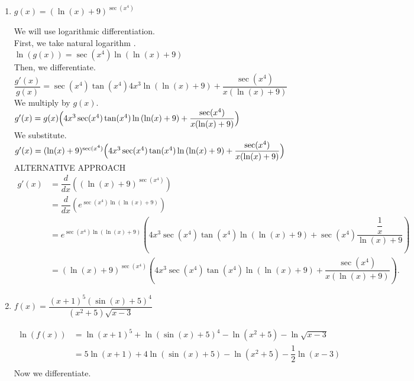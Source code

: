 \documentclass{ximera}
\begin{document}
\begin{problem}
\begin{enumerate}
\begin{explanation}
		\end{explanation}

	\item  $g(x) = (\ln(x) + 9)^{\sec(x^4)}$\\
\begin{explanation}
	We will use logarithmic differentiation.\\
	
	First, we take natural logarithm .\\
	 
	 $\ln{(g(x))} = \sec(x^4)\ln{(\ln(x) + 9)}$\\
	 
	Then, we differentiate.\\
	
	 $\dfrac{g'(x)}{g(x)} = \sec(x^4)\tan(x^4)4x^3\ln{(\ln(x) + 9)}+\dfrac{\sec(x^4)}{x(\ln(x) + 9)}$\\
	 
	We  multiply by $g(x)$.\\
	
		 $g'(x) = g(x)\Bigl(4x^3\sec(x^4)\tan(x^4)\ln{(\ln(x) + 9)}+\dfrac{\sec(x^4)}{x(\ln(x) + 9)}\Bigr)$\\
		 
		 We substitute.
		 \\
		 
		  $g'(x) =(\ln(x) + 9)^{\sec(x^4)}\Bigl(4x^3\sec(x^4)\tan(x^4)\ln{(\ln(x) + 9)}+\dfrac{\sec(x^4)}{x(\ln(x) + 9)}\Bigr)$\\
		 
		 ALTERNATIVE APPROACH\\
		 
			\begin{align*}
			g'(x) &= \dfrac{d}{dx} \left( (\ln(x) + 9)^{\sec(x^4)} \right) \\
			&= \dfrac{d}{dx} \left( e^{\sec(x^4) \ln ( \ln(x) + 9) } \right) \\
			&= e^{\sec(x^4) \ln ( \ln(x) + 9)} \left( 4x^3 \sec(x^4) \tan(x^4) \ln(\ln(x) + 9) + \sec(x^4) \dfrac{\dfrac{1}{x}}{\ln(x) + 9} \right) \\
			&= (\ln(x) + 9)^{\sec(x^4)} \left( 4x^3 \sec(x^4) \tan(x^4) \ln(\ln(x) + 9) + \dfrac{\sec(x^4)}{x(\ln(x) + 9)} \right) .
			\end{align*}
		\end{explanation}
\item  $f(x) = \dfrac{(x+1)^5(\sin(x)+5)^4}{(x^2 + 5)\sqrt{x-3}}$
\begin{explanation}
           \begin{align*}
            \ln{(f(x))} &= \ln{(x+1)^5}+\ln{(\sin(x)+5)^4}-\ln{(x^2 + 5)}-\ln{\sqrt{x-3}}\\
            &= 5\ln{(x+1)}+4\ln{(\sin(x)+5)}-\ln{(x^2 + 5)}-\dfrac{1}{2}\ln{(x-3)}\\
             \end{align*}
             Now we differentiate.\\
             

\end{explanation}
\end{enumerate}
\end{problem}
\end{document}
